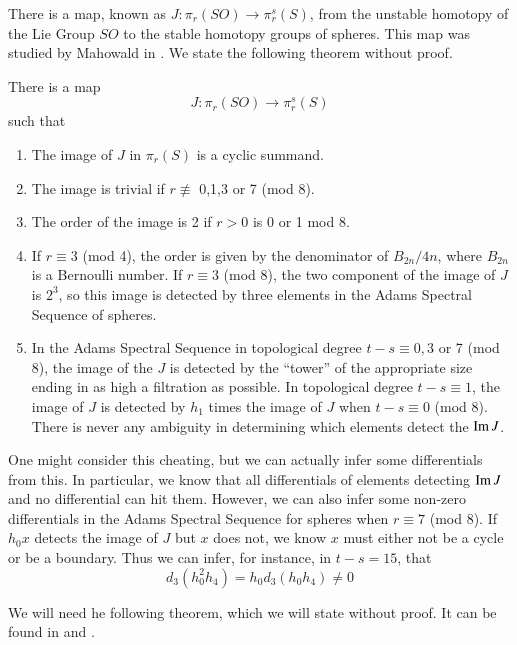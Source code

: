 There is a map, known as $J:\pi_r(SO)\to \pi_r^s(S)$, from the unstable homotopy of the Lie Group $SO$ to the stable homotopy groups of spheres.  This map was studied by Mahowald in \cite{imJ}.  We state the following theorem without proof.
\begin{Theorem}
  \label{sec:jthm}
  There is a map 
  \[J:\pi_r(SO)\to \pi_r^s(S)\]
  such that
  \begin{enumerate}
  \item The image of $J$ in $\pi_r(S)$ is a cyclic summand.
  \item The image is trivial if $r\not\equiv$ 0,1,3  or 7 (mod 8).  
  \item The order of the image is 2 if $r>0$ is 0 or 1 mod 8.  
  \item If $r\equiv 3$ (mod 4), the order is given by the denominator of $B_{2n}/4n$, where $B_{2n}$ is a Bernoulli number.  If $r\equiv 3$ (mod 8), the two component of the image of $J$ is $2^3$, so this image is detected by three elements in the Adams Spectral Sequence of spheres.  
  \item In the Adams Spectral Sequence in topological degree $t-s\equiv0,3$ or 7 (mod 8), the image of the $J$ is detected by the ``tower'' of the appropriate size ending in as high a filtration as possible.  In topological degree $t-s\equiv 1$, the image of $J$ is detected by $h_1$ times the image of $J$ when $t-s\equiv 0$ (mod 8).  
    There is never any ambiguity in determining which elements detect the $\operatorname{Im}\nolimits J$. 
  \end{enumerate}
\end{Theorem}


One might consider this cheating, but we can actually infer some differentials from this.
In particular, we know that all differentials of elements detecting $\operatorname{Im}\nolimits J$ and no differential can hit them.  However, we can also infer some non-zero differentials in the Adams Spectral Sequence for spheres when $r\equiv 7$ (mod 8).  
If $h_0x$ detects the image of $J$ but $x$ does not, we know $x$ must either not be a cycle or be a boundary.  Thus we can infer, for instance, in $t-s=15$, that
\[d_3(h_0^2h_4) = h_0d_3(h_0h_4)\ne 0\]


We will need he following theorem, which we will state without proof.  It can be found in \cite{milgramGroupReps} and \cite[V.2.14-V.2.17]{H00RingSpectra}.


